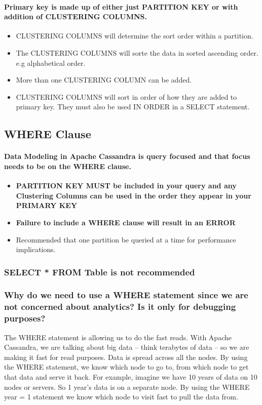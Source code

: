 \documentclass[
	paper=a4,%
	pagesize,%
	8pt, fleqn,%
	headings=small,%
	notitlepage,%
	parskip=never]%
	{scrreprt}
\begin{document}
\begin{multicols*}{3}
\paragraph{Primary key is made up of either just PARTITION KEY or with addition of CLUSTERING COLUMNS.}

\begin{itemize}
\item CLUSTERING COLUMNS will determine the sort order within a partition.
\item The CLUSTERING COLUMNS will sorte the data in sorted ascending order. e.g alphabetical order. 
\item More than one CLUSTERING COLUMN can be added. 
\item CLUSTERING COLUMNS will sort in order of how they are added to primary key. They must also be used IN ORDER in a SELECT statement.
\end{itemize}

\subsection{WHERE Clause}
\paragraph{Data Modeling in Apache Cassandra is query focused and that focus needs to be on the WHERE clause.}

\begin{itemize}
\item \textbf{PARTITION KEY MUST be included in your query and any Clustering Columns can be used in the order they appear in your PRIMARY KEY}

\item \textbf{Failure to include a WHERE clause will result in an ERROR}

\item Recommended that one partition be queried at a time for performance implications.
\end{itemize}

\subsubsection*{SELECT * FROM Table is not recommended}

\subsubsection*{Why do we need to use a WHERE statement since we are not concerned about analytics? Is it only for debugging purposes?}
The WHERE statement is allowing us to do the fast reads. With Apache Cassandra, we are talking about big data -- think terabytes of data -- so we are making it fast for read purposes. Data is spread across all the nodes. By using the WHERE statement, we know which node to go to, from which node to get that data and serve it back. For example, imagine we have 10 years of data on 10 nodes or servers. So 1 year's data is on a separate node. By using the WHERE year = 1 statement we know which node to visit fast to pull the data from.


\end{multicols*}
\end{document}
